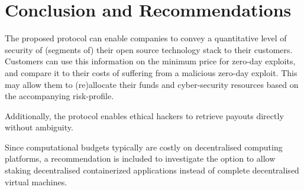 \section{Conclusion and Recommendations}
\label{sec:conclusion}
The proposed protocol can enable companies to convey a quantitative level of security of (segments of) their open source technology stack to their customers. Customers can use this information on the minimum price for zero-day exploits, and compare it to their costs of suffering from a malicious zero-day exploit. This may allow them to (re)allocate their funds and cyber-security resources based on the accompanying risk-profile. 

Additionally, the protocol enables ethical hackers to retrieve payouts directly without ambiguity.

Since computational budgets typically are costly on decentralised computing platforms, a recommendation is included to investigate the option to allow staking decentralised containerized applications instead of complete decentralised virtual machines.





